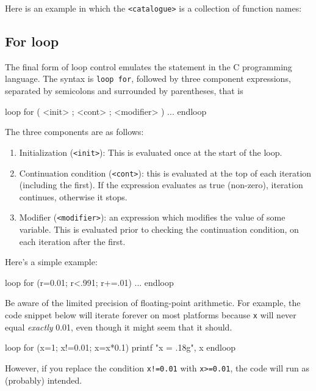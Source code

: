 Here is an example in which the \texttt{<catalogue>} is a collection
of function names: 

\subsection{For loop}

The final form of loop control emulates the  statement in the
C programming language.  The syntax is \texttt{loop for}, followed by
three component expressions, separated by semicolons and surrounded by
parentheses, that is
\begin{code}
loop for ( <init> ; <cont> ; <modifier> )
   ...
endloop
\end{code}

The three components are as follows:
\begin{enumerate}
\item Initialization (\texttt{<init>}): This is evaluated once at the
  start of the loop.
\item Continuation condition (\texttt{<cont>}): this is evaluated at
  the top of each iteration (including the first).  If the expression
  evaluates as true (non-zero), iteration continues, otherwise it
  stops. 
\item Modifier (\texttt{<modifier>}): an expression which modifies the
  value of some variable.  This is evaluated prior to checking the
  continuation condition, on each iteration after the first.
\end{enumerate}

Here's a simple example:
%
\begin{code}
loop for (r=0.01; r<.991; r+=.01)
   ...
endloop
\end{code}

Be aware of the limited precision of floating-point arithmetic. For
example, the code snippet below will iterate forever on most platforms
because \texttt{x} will never equal \textit{exactly} 0.01, even though
it might seem that it should.
\begin{code}
loop for (x=1; x!=0.01; x=x*0.1)
    printf "x = .18g\n", x
endloop  
\end{code}
However, if you replace the condition \texttt{x!=0.01} with
\texttt{x>=0.01}, the code will run as (probably) intended.
 
\vspace{1ex}

